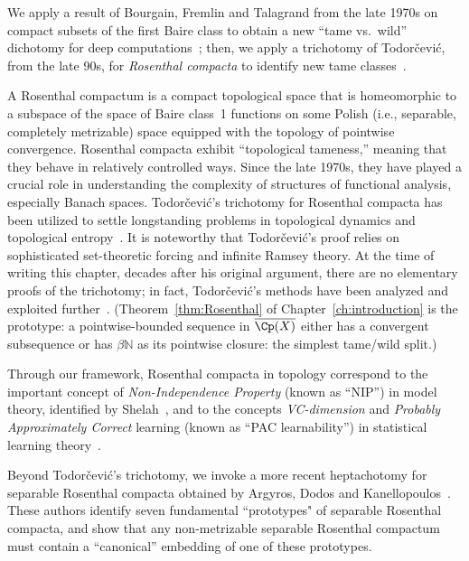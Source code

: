 We apply a result of Bourgain, Fremlin and Talagrand from the late 1970s on compact subsets of the first Baire class to obtain a new ``tame vs.\ wild'' dichotomy for deep computations~\cite{BFT_1978_PCompactBaire}; then, we apply a trichotomy of Todorčević, from the late 90s, for \emph{Rosenthal compacta} to identify new tame classes~\cite{Todorcevic_1999_CompactSubsetsBaire}.

A Rosenthal compactum is a compact topological space that is homeomorphic to a subspace of the space of Baire class~1 functions on some Polish (i.e., separable, completely metrizable) space equipped with the topology of pointwise convergence.
Rosenthal compacta exhibit ``topological tameness,'' meaning that they behave in relatively controlled ways.
Since the late 1970s, they have played a crucial role in understanding the complexity of structures of functional analysis, especially Banach spaces.
Todorčević's trichotomy for Rosenthal compacta has been utilized to settle longstanding problems in topological dynamics and topological entropy~\cite{glasner2022tame}.
It is noteworthy that Todorčević's proof relies on sophisticated set-theoretic forcing and infinite Ramsey theory.
At the time of writing this chapter, decades after his original argument, there are no elementary proofs of the trichotomy; in fact, Todorčević's methods have been analyzed and exploited further~\cite{Todorcevic:2023,horowitz2019compactsetsbaireclass}.
(Theorem~\ref{thm:Rosenthal} of Chapter~\ref{ch:introduction} is the prototype: a pointwise-bounded sequence in $\overline{\Cp(X)}$ either has a convergent subsequence or has $\beta\mathbb{N}$ as its pointwise closure: the simplest tame/wild split.)

Through our framework, Rosenthal compacta in topology correspond to the important concept of \emph{Non-Independence Property} (known as ``NIP'') in model theory, identified by Shelah~\cite{Shelah:1971,Shelah:1990}, and to the concepts \emph{VC-dimension} and \emph{Probably Approximately Correct} learning (known as ``PAC learnability'') in statistical learning theory~\cite{Vapnik-Chervonenkis:1971, Vapnik-Chervonenkis:1974, Valiant:1984}.

Beyond Todorčević's trichotomy, we invoke a more recent heptachotomy for separable Rosenthal compacta obtained by Argyros, Dodos and Kanellopoulos~\cite{argyros2008rosenthal}.
These authors identify seven fundamental ``prototypes" of separable Rosenthal compacta, and show that any non-metrizable separable Rosenthal compactum must contain a ``canonical'' embedding of one of these prototypes.

